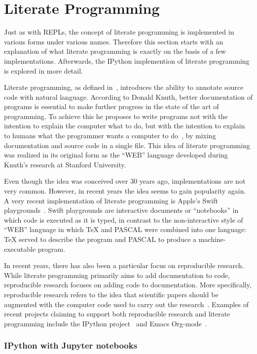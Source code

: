 \section{Literate Programming}
\label{sec:literate-programming}
Just as with REPLs, the concept of literate programming is implemented in
various forms under various names. Therefore this section starts with an
explanation of what literate programming is exactly on the basis of a few
implementations. Afterwards, the IPython implemention of literate programming is
explored in more detail.

Literate programming, as defined in~\cite{knuth1984}, introduces the ability to
annotate source code with natural language. According to Donald Knuth, better
documentation of programs is essential to make further progress in the state of
the art of programming.  To achieve this he proposes to write programs not with
the intention to explain the computer what to do, but with the intention to
explain to humans what the programmer wants a computer to do~\cite{knuth1984},
by mixing documentation and source code in a single file. This idea of
literate programming was realized in its original form as the ``WEB'' language
developed during Knuth's research at Stanford University.

Even though the idea was conceived over 30 years ago, implementations are not
very common. However, in recent years the idea seems to gain popularity again.
A very recent implementation of literate programming is Apple's Swift
playgrounds~\cite{swift-playgrounds}. Swift playgrounds are interactive
documents or ``notebooks'' in which code is executed as it is typed, in
contrast to the non-interactive style of ``WEB'' language in which \TeX{} and
PASCAL were combined into one language: \TeX{} served to describe the program
and PASCAL to produce a machine-executable program.

In recent years, there has also been a particular focus on reproducible
research. While literate programming primarily aims to add documentation to
code, reproducible research focuses on adding code to documentation. More
specifically, reproducible research refers to the idea that scientific papers
should be augmented with the computer code used to carry out the
research~\cite{schulte2012}. Examples of recent projects claiming to support
both reproducible research and literate programming include the IPython
project~\cite{ipython2007} and Emacs Org-mode~\cite{schulte2012}.

\subsubsection{IPython with Jupyter notebooks}

